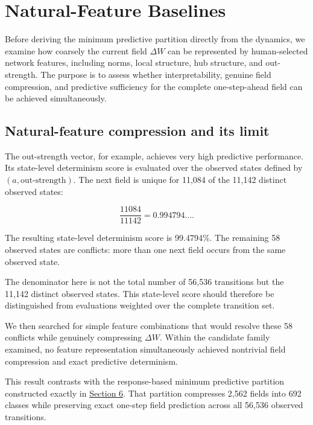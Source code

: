 \documentclass[
  11pt,
]{article}
\begin{document}
\section{Natural-Feature Baselines}\label{natural-feature-baselines}

Before deriving the minimum predictive partition directly from the
dynamics, we examine how coarsely the current field \({\Delta W}\) can
be represented by human-selected network features, including norms,
local structure, hub structure, and out-strength. The purpose is to
assess whether interpretability, genuine field compression, and
predictive sufficiency for the complete one-step-ahead field can be
achieved simultaneously.

\hypertarget{natural-feature-compression-and-its-limit}{%
\subsection{Natural-feature compression and its
limit}\label{natural-feature-compression-and-its-limit}}

The out-strength vector, for example, achieves very high predictive
performance. Its state-level determinism score is evaluated over the
observed states defined by \({(a,\mathrm{out\mbox{-}strength})}\). The
next field is unique for 11,084 of the 11,142 distinct observed states:

\[{\frac{11084}{11142}=0.994794\ldots.}\]

The resulting state-level determinism score is 99.4794\%. The remaining
58 observed states are conflicts: more than one next field occurs from
the same observed state.

The denominator here is not the total number of 56,536 transitions but
the 11,142 distinct observed states. This state-level score should
therefore be distinguished from evaluations weighted over the complete
transition set.

We then searched for simple feature combinations that would resolve
these 58 conflicts while genuinely compressing \({\Delta W}\). Within
the candidate family examined, no feature representation simultaneously
achieved nontrivial field compression and exact predictive determinism.

This result contrasts with the response-based minimum predictive
partition constructed exactly in \hyperref[exact-minimum-predictive-partition]{Section 6}. That partition compresses
2,562 fields into 692 classes while preserving exact one-step field
prediction across all 56,536 observed transitions.
\end{document}
